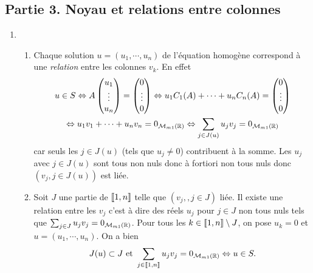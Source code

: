 \subsection*{Partie 3. Noyau et relations entre colonnes}
\begin{enumerate}
  \item
  \begin{enumerate}
    \item Chaque solution $u=(u_1,\cdots, u_n)$ de l'équation homogène correspond à une \emph{relation} entre les colonnes $v_k$. En effet
\begin{multline*}
  u \in S
  \Leftrightarrow
  A 
  \begin{pmatrix}
    u_1 \\ \vdots\\ u_n
  \end{pmatrix} =
  \begin{pmatrix}
    0 \\ \vdots \\ 0
  \end{pmatrix}
\Leftrightarrow
u_1 C_1(A) + \cdots + u_n C_n(A)  =    \begin{pmatrix}
    0 \\ \vdots \\ 0
  \end{pmatrix}\\
\Leftrightarrow
u_1 v_1 + \cdots + u_n v_n = 0_{\mathcal{M}_{m 1}(\mathbb{R})}
\Leftrightarrow
\sum_{j\in J(u)}u_j v_j = 0_{\mathcal{M}_{m 1}(\mathbb{R})}
\end{multline*}
car seuls les $j \in J(u)$ (tels que $u_j \neq 0$) contribuent à la somme. Les $u_j$ avec $j \in J(u)$ sont tous non nuls donc à fortiori non tous nuls donc $\left( v_j, j\in J(u)\right)$ est liée.

    \item Soit $J$ une partie de $\llbracket 1,n\rrbracket$ telle que $\left( v_j, ,j\in J\right)$ liée. Il existe une relation entre les $v_j$ c'est à dire des réels $u_j$ pour $j \in J$ non tous nuls tels que $\sum_{j\in J}u_j v_j = 0_{\mathcal{M}_{m 1}(\mathbb{R})}$. Pour tous les $k \in \llbracket 1,n\rrbracket \setminus J$, on pose $u_k = 0$ et $u=(u_1, \cdots, u_n)$. On a bien
\[
  J(u) \subset J \text{ et } \sum_{j \in \llbracket 1,n\rrbracket } u_j v_j = 0_{\mathcal{M}_{m 1}(\mathbb{R})}\Leftrightarrow u \in S.
\]
  \end{enumerate}
   

\end{enumerate}
